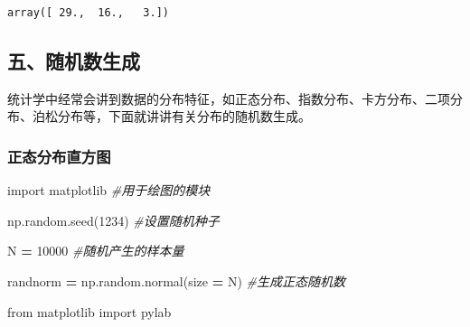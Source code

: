 \documentclass[]{article}
\newenvironment{Shaded}{\begin{snugshade}}{\end{snugshade}}
\newcommand{\DecValTok}[1]{\textcolor[rgb]{0.00,0.00,0.81}{#1}}
\newcommand{\ImportTok}[1]{#1}
\newcommand{\CommentTok}[1]{\textcolor[rgb]{0.56,0.35,0.01}{\textit{#1}}}
\newcommand{\OperatorTok}[1]{\textcolor[rgb]{0.81,0.36,0.00}{\textbf{#1}}}
\newcommand{\NormalTok}[1]{#1}
\begin{document}
\begin{verbatim}
array([ 29.,  16.,   3.])
\end{verbatim}

\subsection{五、随机数生成}

统计学中经常会讲到数据的分布特征，如正态分布、指数分布、卡方分布、二项分布、泊松分布等，下面就讲讲有关分布的随机数生成。

\subsubsection{正态分布直方图}

\begin{Shaded}
\begin{Highlighting}[]
\OperatorTok{%
\end{Highlighting}
\end{Shaded}

\begin{Shaded}
\begin{Highlighting}[]
\ImportTok{import}\NormalTok{ matplotlib }\CommentTok{#用于绘图的模块}
\end{Highlighting}
\end{Shaded}

\begin{Shaded}
\begin{Highlighting}[]
\NormalTok{np.random.seed(}\DecValTok{1234}\NormalTok{) }\CommentTok{#设置随机种子}
\end{Highlighting}
\end{Shaded}

\begin{Shaded}
\begin{Highlighting}[]
\NormalTok{N }\OperatorTok{=} \DecValTok{10000} \CommentTok{#随机产生的样本量}
\end{Highlighting}
\end{Shaded}

\begin{Shaded}
\begin{Highlighting}[]
\NormalTok{randnorm }\OperatorTok{=}\NormalTok{ np.random.normal(size }\OperatorTok{=}\NormalTok{ N) }\CommentTok{#生成正态随机数}
\end{Highlighting}
\end{Shaded}

\begin{Shaded}
\begin{Highlighting}[]
\ImportTok{from}\NormalTok{ matplotlib }\ImportTok{import}\NormalTok{ pylab}
\end{Highlighting}
\end{Shaded}
\end{document}
